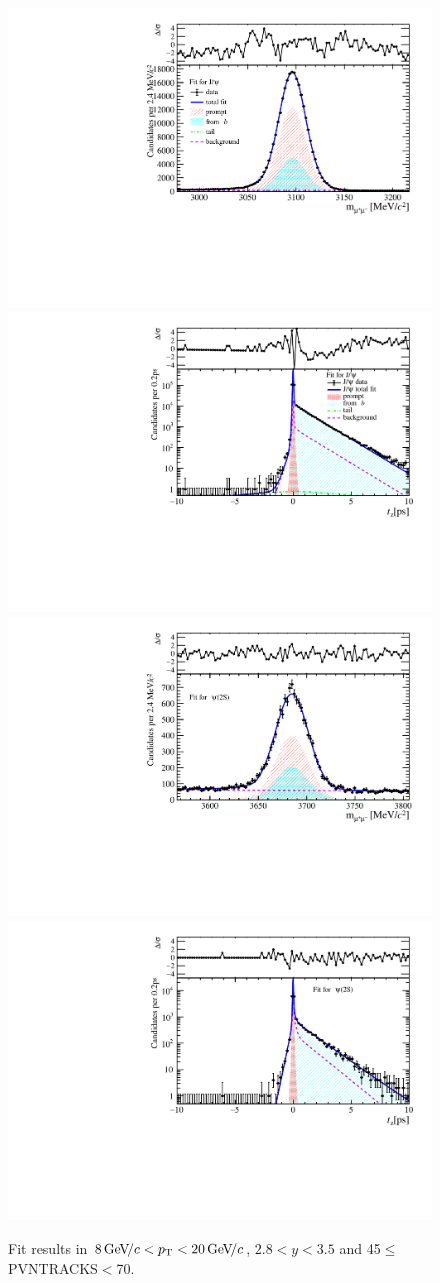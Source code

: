 \begin{figure}[H]
\begin{center}
\includegraphics[width=0.47\linewidth]{pdf/Jpsi/drawmass/n3y2pt5.pdf}
\includegraphics[width=0.47\linewidth]{pdf/Jpsi/2DFit/n3y2pt5.pdf}
\vspace*{-0.5cm}
\includegraphics[width=0.47\linewidth]{pdf/Psi2S/drawmass/n3y2pt5.pdf}
\includegraphics[width=0.47\linewidth]{pdf/Psi2S/2DFit/n3y2pt5.pdf}
\vspace*{-0.5cm}
\end{center}
\caption{Fit results in $8\text{\,Ge\kern -0.1em V\!/}c<p_{\mathrm{T}}<20\text{\,Ge\kern -0.1em V\!/}c$, $2.8<y<3.5$ and 45$\leq$PVNTRACKS$<$70.}
\label{Fitn3y2pt5}
\end{figure}
